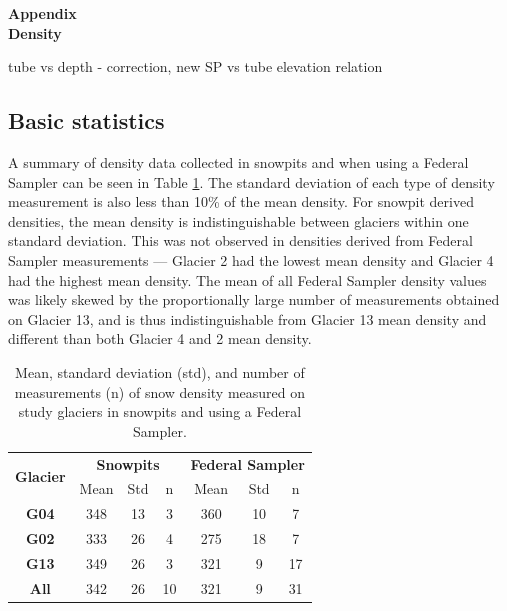 \documentclass[12pt]{article}
\begin{document}

\begin{center}
\Large \textbf{Appendix\\ Density}
\end{center}

tube vs depth - correction, new SP vs tube
elevation relation



\subsection*{Basic statistics}

A summary of density data collected in snowpits and when using a Federal Sampler can be seen in Table \ref{tab:density_stats}. The standard deviation of each type of density measurement is also less than 10\% of the mean density. For snowpit derived densities, the mean density is indistinguishable between glaciers within one standard deviation. This was not observed in densities derived from Federal Sampler measurements --- Glacier 2 had the lowest mean density and Glacier 4 had the highest mean density. The mean of all Federal Sampler density values was likely skewed by the proportionally large number of measurements obtained on Glacier 13, and is thus indistinguishable from Glacier 13 mean density and different than both Glacier 4 and 2 mean density. 

\begin{table}[b!]
\centering
\caption{Mean, standard deviation (std), and number of measurements (n) of snow density measured on study glaciers in snowpits and using a Federal Sampler. }
\label{tab:density_stats}
\begin{tabular}{ccccccc}
\multirow{2}{*}{\textbf{Glacier}} & \multicolumn{3}{c}{\textbf{Snowpits}}     & \multicolumn{3}{c}{\textbf{Federal Sampler}} \\ 
                                  & Mean & Std & n & Mean  & Std  & n \\ \hline
\textbf{G04}                      & 348           & 13           & 3          & 360            & 10            & 7           \\
\textbf{G02}                      & 333           & 26           & 4          & 275            & 18            & 7           \\
\textbf{G13}                      & 349           & 26           & 3         & 321            & 9             & 17          \\
\textbf{All}                      & 342           & 26           & 10         & 321            & 9             & 31         
\end{tabular}
\end{table}
\end{document}
